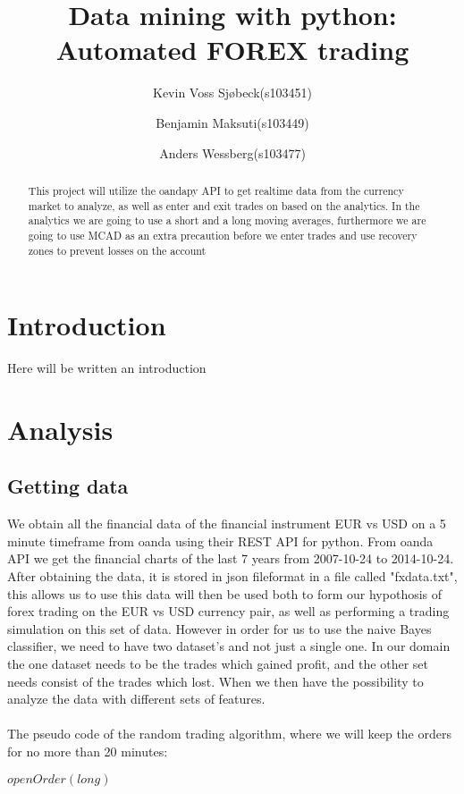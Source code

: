\documentclass[10pt]{IEEEtran}
\title{Data mining with python: \\Automated FOREX trading}
\author{
	Kevin Voss Sjøbeck(s103451)\\
	\and
	Benjamin Maksuti(s103449)\\
	\and
	Anders Wessberg(s103477)
}
\begin{document}
\maketitle

\begin{abstract}
This project will utilize the oandapy API to get realtime data from the currency market to analyze, as well as enter and exit trades on based on the analytics. In the analytics we are going to use a short and a long moving averages, furthermore we are going to use MCAD as an extra precaution before we enter trades and use recovery zones to prevent losses on the account
\end{abstract}

\section{Introduction}
Here will be written an introduction


\section{Analysis}

\subsection{Getting data}
We obtain all the financial data of the financial instrument EUR vs USD on a 5 minute timeframe from oanda using their REST API for python. From oanda API we get the financial charts of the last 7 years from 2007-10-24 to 2014-10-24. After obtaining the data, it is stored in json fileformat in a file called "fxdata.txt", this allows us to use this data will then be used both to form our hypothosis of forex trading on the EUR vs USD currency pair, as well as performing a trading simulation on this set of data. However in order for us to use the naive Bayes classifier, we need to have two dataset's and not just a single one. In our domain the one dataset needs to be the trades which gained profit, and the other set needs consist of the trades which lost. When we then have the possibility to analyze the data with different sets of features.\\
\\
The pseudo code of the random trading algorithm, where we will keep the orders for no more than 20 minutes:

\begin{center}
\begin{algorithmic}
    	\State $openOrder(long)$	    
	\EndIf
		\Else
		\EndIf
	\EndFor
\EndWhile
{}
\end{algorithmic}
\end{center}
\end{document}
